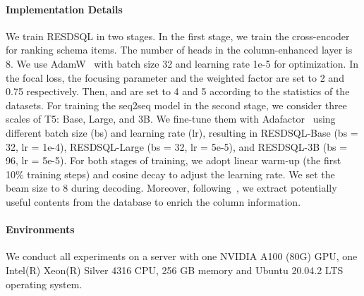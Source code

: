 \documentclass[letterpaper]{article} \usepackage{aaai23}  \usepackage{times}  \usepackage{helvet}  \usepackage{courier}  \usepackage[hyphens]{url}  \usepackage{graphicx} \urlstyle{rm} \def\UrlFont{\rm}  \usepackage{natbib}  \usepackage{caption} \frenchspacing  \setlength{\pdfpagewidth}{8.5in}  \setlength{\pdfpageheight}{11in}  \usepackage{algorithm}
\newcommand{\model}{RESDSQL}
\newcommand{\smodel}{RESDSQL }
\begin{document}
\paragraph{Implementation Details} 
We train \smodel in two stages. In the first stage, we train the cross-encoder for ranking schema items. The number of heads  in the column-enhanced layer is 8. 
We use AdamW~\citep{ilya2019decoupled} with batch size 32 and learning rate 1e-5 for optimization. 
In the focal loss, the focusing parameter  and the weighted factor  are set to 2 and 0.75 respectively. Then,  and  are set to 4 and 5 according to the statistics of the datasets.  
For training the seq2seq model in the second stage, we consider three scales of T5: Base, Large, and 3B. We fine-tune them with Adafactor~\citep{noam2018adafactor} using different batch size (bs) and learning rate (lr), resulting in \model-Base (bs = 32, lr = 1e-4), \model-Large (bs = 32, lr = 5e-5), and \model-3B (bs = 96, lr = 5e-5). For both stages of training, we adopt linear warm-up (the first 10\% training steps) and cosine decay to adjust the learning rate. We set the beam size to 8 during decoding. Moreover, following~\citet{xi2020bridging}, we extract potentially useful contents from the database to enrich the column information.

\paragraph{Environments} We conduct all experiments on a server with one NVIDIA A100 (80G) GPU, one Intel(R) Xeon(R) Silver 4316 CPU, 256 GB memory and Ubuntu 20.04.2 LTS operating system.
\end{document}
